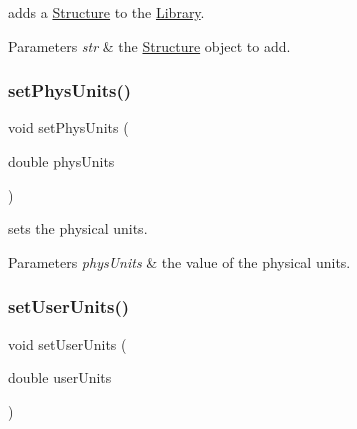 adds a \mbox{\hyperlink{class_a_g_d_s_1_1_structure}{Structure}} to the \mbox{\hyperlink{class_a_g_d_s_1_1_library}{Library}}. 


\begin{DoxyParams}{Parameters}
{\em str} & the \mbox{\hyperlink{class_a_g_d_s_1_1_structure}{Structure}} object to add. \\
\hline
\end{DoxyParams}
\mbox{\label{class_a_g_d_s_1_1_library_a938acb6eb8d14aade9dba7331c75ff0a}} 
\subsubsection{\texorpdfstring{set\+Phys\+Units()}{setPhysUnits()}}
{\footnotesize\ttfamily void set\+Phys\+Units (\begin{DoxyParamCaption}\item[{double}]{phys\+Units }\end{DoxyParamCaption})\hspace{0.3cm}{\ttfamily [inline]}}



sets the physical units. 


\begin{DoxyParams}{Parameters}
{\em phys\+Units} & the value of the physical units. \\
\hline
\end{DoxyParams}
\mbox{\label{class_a_g_d_s_1_1_library_a0d0e972bb142f892c462bb8d7f04a50b}} 
\subsubsection{\texorpdfstring{set\+User\+Units()}{setUserUnits()}}
{\footnotesize\ttfamily void set\+User\+Units (\begin{DoxyParamCaption}\item[{double}]{user\+Units }\end{DoxyParamCaption})\hspace{0.3cm}{\ttfamily [inline]}}



